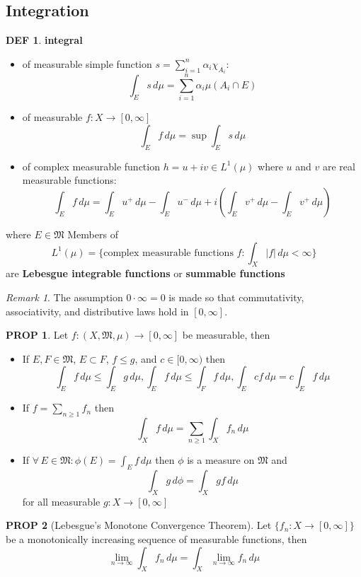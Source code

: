 \documentclass[hidelinks,10pt]{article}
\theoremstyle{definition}
\newtheorem*{defin}{DEF}
\theoremstyle{dotles}
\theoremstyle{dotless}
\newtheorem{proposition}{PROP}[section]
\theoremstyle{remark}
\newtheorem*{remark}{Remark}
\begin{document}
\subsection{Integration}

\begin{defin}
\textbf{integral}\begin{itemize}
    \item of measurable simple function $s=\sum_{i=1}^n\alpha_i\chi_{A_i}$:
    \[\int_Es\,d\mu=\sum\limits_{i=1}^n\alpha_i\mu(A_i\cap E)\]
    \item of measurable $f:X\to[0,\infty]$
    \[\int_Ef\,d\mu=\sup\int_Es\,d\mu\]
    \item of complex measurable function $h=u+iv\in L^1(\mu)$ where $u$ and $v$ are real measurable functions:
    \[\int_Ef\,d\mu=\int_Eu^+\,d\mu-\int_Eu^-\,d\mu+i\left(\int_Ev^+\,d\mu-\int_Ev^+\,d\mu\right)\]
\end{itemize}
where $E\in\mathfrak{M}$\bigbreak
Members of
\[L^1(\mu)=\{\textrm{complex measurable functions }f:\int_X|f|\,d\mu<\infty\}\]
are \textbf{Lebesgue integrable functions} or \textbf{summable functions}
\end{defin}

\begin{remark}
The assumption $0\cdot\infty=0$ is made so that commutativity, associativity, and distributive laws hold in $[0,\infty]$.
\end{remark}

\begin{proposition}
Let $f:(X,\mathfrak{M},\mu)\to[0,\infty]$ be measurable, then\begin{itemize}
    \item If $E,F\in\mathfrak{M}$, $E\subset F$, $f\leq g$, and $c\in[0,\infty)$ then
    \[\int_Ef\,d\mu\leq\int_Eg\,d\mu,\int_Ef\,d\mu\leq\int_Ff\,d\mu,\int_Ecf\,d\mu=c\int_Ef\,d\mu\]
    \item If $f=\sum_{n\geq1}f_n$ then
    \[\int_Xf\,d\mu=\sum_{n\geq1}\int_Xf_n\,d\mu\]
    \item If $\forall\,E\in\mathfrak{M}:\phi(E)=\int_Ef\,d\mu$ then $\phi$ is a measure on $\mathfrak{M}$ and
    \[\int_Xg\,d\phi=\int_Xgf\,d\mu\]
    for all measurable $g:X\to[0,\infty]$
\end{itemize}
\end{proposition}

\begin{proposition}[Lebesgue's Monotone Convergence Theorem]
Let $\{f_n:X\to[0,\infty]\}$ be a monotonically increasing sequence of measurable functions, then
\[\lim_{n\to\infty}\int_Xf_n\,d\mu=\int_X\lim_{n\to\infty}f_n\,d\mu\]
\end{proposition}
\end{document}
